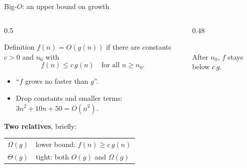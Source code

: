 \documentclass[aspectratio=169]{beamer}
\begin{document}
\begin{frame}{Big-$O$: an upper bound on growth}
\begin{columns}[c]
\begin{column}{0.5\textwidth}
\small
\begin{block}{Definition}
$f(n) = O(g(n))$ if there are constants $c>0$ and $n_0$ with
\[
f(n) \le c\,g(n) \quad \text{for all } n \ge n_0 .
\]
\end{block}
\begin{itemize}
  \item ``$f$ grows no faster than $g$''.
  \item Drop constants and smaller terms:\\ $3n^2 + 10n + 50 = O(n^2)$.
\end{itemize}
\vspace{0.1cm}
\textbf{Two relatives}, briefly:\\[2pt]
\begin{tabular}{ll}
$\Omega(g)$ & lower bound: $f(n) \ge c\,g(n)$ \\
$\Theta(g)$ & tight: both $O(g)$ and $\Omega(g)$ \\
\end{tabular}
\end{column}
\begin{column}{0.48\textwidth}
\centering
{}\\[4pt]
\scriptsize After $n_0$, $f$ stays below $c\,g$.
\end{column}
\end{columns}
\end{frame}
\end{document}
